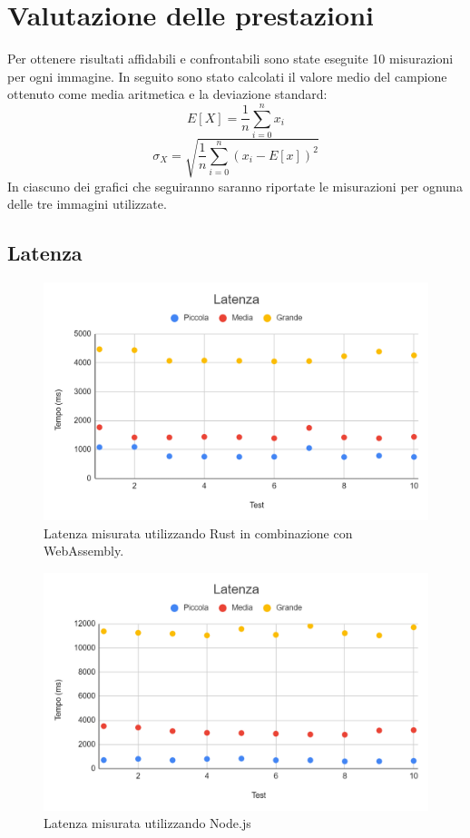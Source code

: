 \section{Valutazione delle prestazioni}
Per ottenere risultati affidabili e confrontabili sono state eseguite 10 misurazioni per ogni immagine.
In seguito sono stato calcolati il valore medio del campione ottenuto come media aritmetica e la deviazione standard:
\begin{equation*}
    E[X]=\frac{1}{n}\sum_{i=0}^{n}x_i
\end{equation*}
\begin{equation*}
    \sigma_X = \sqrt{\frac{1}{n}\sum_{i=0}^{n}(x_i-E[x])^2}
\end{equation*}
In ciascuno dei grafici che seguiranno saranno riportate le misurazioni per ognuna delle tre immagini utilizzate.
\subsection{Latenza}
\begin{figure}
    \begin{center}
            \includegraphics[width=1\columnwidth]{images/rust_latenza.png}
    \end{center}
    \caption{Latenza misurata utilizzando Rust in combinazione con WebAssembly.}
\end{figure}
\begin{figure}
    \begin{center}
            \includegraphics[width=1\columnwidth]{images/node_latenza.png}
    \end{center}
    \caption{Latenza misurata utilizzando Node.js}
\end{figure}
